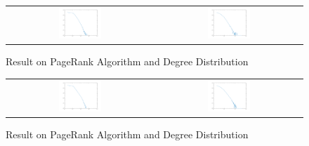 \begin{figure}[H]
\begin{center}
\begin{tabular}{cc}
     \includegraphics[width=0.3\textwidth]{FIG/5pagerank.png} &
     \includegraphics[width=0.3\textwidth]{FIG/5degreedist.png} \\
\end{tabular}
\caption{Result on PageRank Algorithm and Degree Distribution}
\end{center}
\end{figure}

\begin{figure}[H]
\begin{center}
\begin{tabular}{cc}
     \includegraphics[width=0.3\textwidth]{FIG/6pagerank.png} &
     \includegraphics[width=0.3\textwidth]{FIG/6degreedist.png} \\
\end{tabular}
\caption{Result on PageRank Algorithm and Degree Distribution}
\end{center}
\end{figure}

